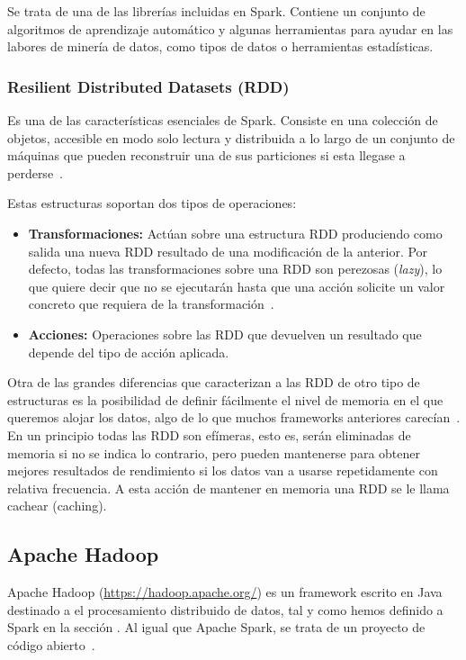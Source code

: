 Se trata de una de las librerías incluidas en Spark. Contiene un conjunto de algoritmos de aprendizaje automático y algunas herramientas para ayudar en las labores de minería de datos, como tipos de datos o herramientas estadísticas.  

\subsubsection{Resilient Distributed Datasets (RDD)}\label{sec:DefRDD}
Es una de las características esenciales de Spark. Consiste en una colección de objetos, accesible en modo solo lectura y distribuida a lo largo de un conjunto de máquinas que pueden reconstruir una de sus particiones si esta llegase a perderse~\cite{SparkPaper}. 

Estas estructuras soportan dos tipos de operaciones:

\begin{itemize}
	\item \textbf{Transformaciones:} Actúan sobre una estructura RDD produciendo como salida una nueva RDD resultado de una modificación de la anterior. Por defecto, todas las transformaciones sobre una RDD son perezosas (\textit{lazy}), lo que quiere decir que no se ejecutarán hasta que una acción solicite un valor concreto que requiera de la transformación~\cite{SparkPaper}.
	\item \textbf{Acciones:} Operaciones sobre las RDD que devuelven un resultado que depende del tipo de acción aplicada.
\end{itemize}

Otra de las grandes diferencias que caracterizan a las RDD de otro tipo de estructuras es la posibilidad de definir fácilmente el nivel de memoria en el que queremos alojar los datos, algo de lo que muchos frameworks anteriores carecían~\cite{RDDPaper}. En un principio todas las RDD son efímeras, esto es, serán eliminadas de memoria si no se indica lo contrario, pero pueden mantenerse para obtener mejores resultados de rendimiento si los datos van a usarse repetidamente con relativa frecuencia. A esta acción de mantener en memoria una RDD se le llama cachear (caching).

\subsection{Apache Hadoop}
Apache Hadoop (\url{https://hadoop.apache.org/}) es un framework escrito en Java destinado a el procesamiento distribuido de datos, tal y como hemos definido a Spark en la sección  . Al igual que Apache Spark, se trata de un proyecto de código abierto~\cite{HadoopPage}.

